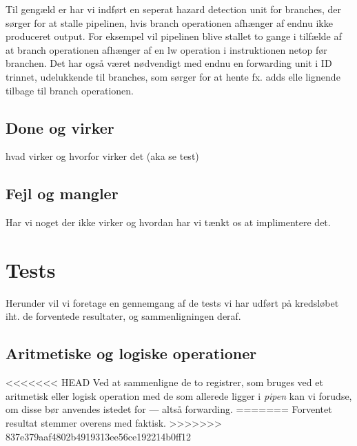 \documentclass[11pt,twoside,a4paper]{article}
\begin{document}
Til gengæld er har vi indført en seperat hazard detection unit for branches,
der sørger for at stalle pipelinen, hvis branch operationen afhænger af endnu
ikke produceret output. For eksempel vil pipelinen blive stallet to gange i
tilfælde af at branch operationen afhænger af en lw operation i instruktionen
netop før branchen. Det har også været nødvendigt med endnu en forwarding
unit i ID trinnet, udelukkende til branches, som sørger for at hente fx. adds
elle lignende tilbage til branch operationen.

\subsection{Done og virker}
hvad virker og hvorfor virker det (aka se test)

\subsection{Fejl og mangler}
Har vi noget der ikke virker og hvordan har vi tænkt os at implimentere det.

\newpage
\pagestyle{fancy}
\section{Tests}
Herunder vil vi foretage en gennemgang af de tests vi har udført på
kredsløbet iht. de forventede resultater, og sammenligningen deraf.

\subsection{Aritmetiske og logiske operationer}
<<<<<<< HEAD
Ved at sammenligne de to registrer, som bruges ved et aritmetisk eller logisk
operation med de som allerede ligger i {\it pipen} kan vi forudse, om disse
bør anvendes istedet for --- altså forwarding.
=======
Forventet resultat stemmer overens med faktisk.
>>>>>>> 837e379aaf4802b4919313ee56ce192214b0ff12
\end{document}
